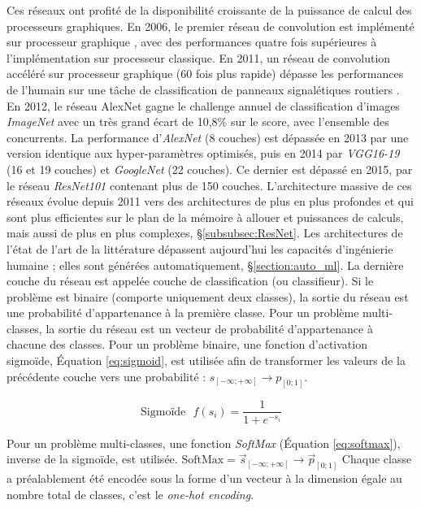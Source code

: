 Ces réseaux ont profité de la disponibilité croissante de la puissance de calcul des processeurs graphiques.
En 2006, le premier réseau de convolution est implémenté sur processeur graphique \cite{chellapilla_high_2006}, avec des performances quatre fois supérieures à l'implémentation sur processeur classique.
En 2011, un réseau de convolution accéléré sur processeur graphique (60 fois plus rapide) dépasse les performances de l'humain sur une tâche de classification de panneaux signalétiques routiers \cite{ciresan_flexible_2011}.
En 2012, le réseau AlexNet \cite{krizhevsky_imagenet_2012} gagne le challenge annuel de classification d'images \textit{ImageNet} \cite{deng_imagenet_2009} avec un très grand écart de 10,8\% sur le score, avec l'ensemble des concurrents.
La performance d'\textit{AlexNet} (8 couches) est dépassée en 2013 par \cite{zeiler_visualizing_2013} une version identique aux hyper-paramètres optimisés, puis en 2014 par \textit{VGG16-19} \cite{simonyan_very_2014} (16 et 19 couches) et \textit{GoogleNet} (22 couches).
Ce dernier est dépassé en 2015, par le réseau \textit{ResNet101} \cite{he_deep_2015} contenant plus de 150 couches.
L'architecture massive de ces réseaux évolue depuis 2011 vers des architectures de plus en plus profondes \cite{he_deep_2015} et qui sont plus efficientes sur le plan de la mémoire à allouer et puissances de calculs, mais aussi de plus en plus complexes, §\ref{subsubsec:ResNet}.
Les architectures de l'état de l'art de la littérature dépassent aujourd'hui les capacités d'ingénierie humaine ; elles sont générées automatiquement, §\ref{section:auto_ml}.
La dernière couche du réseau est appelée couche de classification (ou classifieur).
Si le problème est binaire (comporte uniquement deux classes), la sortie du réseau est une probabilité d'appartenance à la première classe.
Pour un problème multi-classes, la sortie du réseau est un vecteur de probabilité d'appartenance à chacune des classes.
Pour un problème binaire, une fonction d'activation sigmoïde, Équation \ref{eq:sigmoid}, est utilisée afin de transformer les valeurs de la précédente couche vers une probabilité : $s_{[-\infty; +\infty]} \to p_{[0 ; 1]}$.

\begin{equation} \label{eq:sigmoid}
\text{Sigmoïde} \ \ \ f\left(s_{i}\right)=\frac{1}{1+e^{-s_{i}}}
\end{equation}

Pour un problème multi-classes, une fonction \textit{SoftMax} (Équation \ref{eq:softmax}), inverse de la sigmoïde, est utilisée.
$\text{SoftMax} = \vec{s}_{[-\infty; +\infty]} \to \vec{p}_{[0 ; 1]}$
Chaque classe a préalablement été encodée sous la forme d'un vecteur à la dimension égale au nombre total de classes, c'est le \textit{one-hot encoding}.


